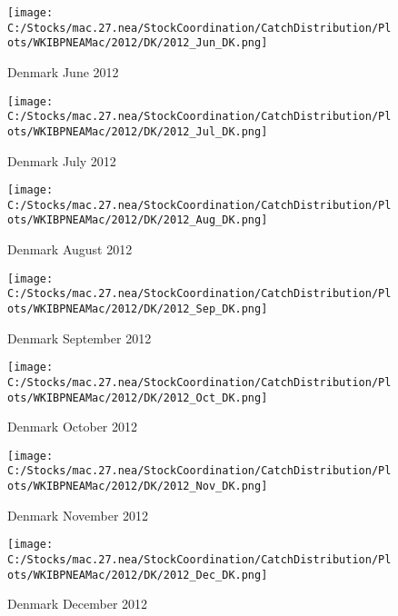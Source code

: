 \documentclass{article}
\begin{document}
\begin{figure}
	\centering
		\texttt{[image: C:/Stocks/mac.27.nea/StockCoordination/CatchDistribution/Plots/WKIBPNEAMac/2012/DK/2012\_Jun\_DK.png]}
	\caption{Denmark June 2012}
	\label{fig:2012_Jun_DK}
\end{figure}

\begin{figure}
	\centering
		\texttt{[image: C:/Stocks/mac.27.nea/StockCoordination/CatchDistribution/Plots/WKIBPNEAMac/2012/DK/2012\_Jul\_DK.png]}
	\caption{Denmark July 2012}
	\label{fig:2012_Jul_DK}
\end{figure}

\begin{figure}
	\centering
		\texttt{[image: C:/Stocks/mac.27.nea/StockCoordination/CatchDistribution/Plots/WKIBPNEAMac/2012/DK/2012\_Aug\_DK.png]}
	\caption{Denmark August 2012}
	\label{fig:2012_Aug_DK}
\end{figure}

\begin{figure}
	\centering
		\texttt{[image: C:/Stocks/mac.27.nea/StockCoordination/CatchDistribution/Plots/WKIBPNEAMac/2012/DK/2012\_Sep\_DK.png]}
	\caption{Denmark September 2012}
	\label{fig:2012_Sep_DK}
\end{figure}

\begin{figure}
	\centering
		\texttt{[image: C:/Stocks/mac.27.nea/StockCoordination/CatchDistribution/Plots/WKIBPNEAMac/2012/DK/2012\_Oct\_DK.png]}
	\caption{Denmark October 2012}
	\label{fig:2012_Oct_DK}
\end{figure}

\begin{figure}
	\centering
		\texttt{[image: C:/Stocks/mac.27.nea/StockCoordination/CatchDistribution/Plots/WKIBPNEAMac/2012/DK/2012\_Nov\_DK.png]}
	\caption{Denmark November 2012}
	\label{fig:2012_Nov_DK}
\end{figure}

\begin{figure}
	\centering
		\texttt{[image: C:/Stocks/mac.27.nea/StockCoordination/CatchDistribution/Plots/WKIBPNEAMac/2012/DK/2012\_Dec\_DK.png]}
	\caption{Denmark December 2012}
	\label{fig:2012_Dec_DK}
\end{figure}

\clearpage

\newpage
\end{document}
